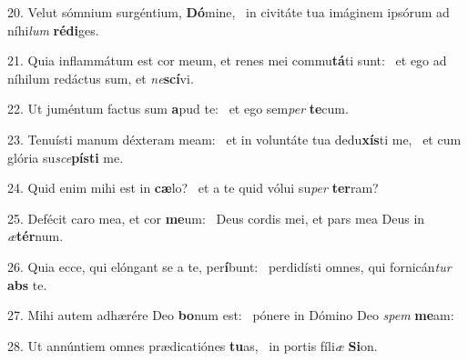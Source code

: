 20. Velut sómnium surgéntium, \textbf{Dó}mine, \ast\  in civitáte tua imáginem ipsórum ad níhi\textit{lum} \textbf{réd}\textbf{i}ges.\

21. Quia inflammátum est cor meum, et renes mei commu\textbf{tá}ti sunt: \ast\  et ego ad níhilum redáctus sum, et \textit{ne}\textbf{scí}vi.\

22. Ut juméntum factus sum \textbf{a}pud te: \ast\  et ego sem\textit{per} \textbf{te}cum.\

23. Tenuísti manum déxteram meam: \dag\  et in voluntáte tua dedu\textbf{xís}ti me, \ast\  et cum glória su\textit{sce}\textbf{pís}\textbf{ti} me.\

24. Quid enim mihi est in \textbf{cæ}lo? \ast\  et a te quid vólui su\textit{per} \textbf{ter}ram?\

25. Defécit caro mea, et cor \textbf{me}um: \ast\  Deus cordis mei, et pars mea Deus in \textit{æ}\textbf{tér}num.\

26. Quia ecce, qui elóngant se a te, per\textbf{í}bunt: \ast\  perdidísti omnes, qui fornicán\textit{tur} \textbf{abs} te.\

27. Mihi autem adhærére Deo \textbf{bo}num est: \ast\  pónere in Dómino Deo \textit{spem} \textbf{me}am:\

28. Ut annúntiem omnes prædicatiónes \textbf{tu}as, \ast\  in portis fíli\textit{æ} \textbf{Si}on.\

